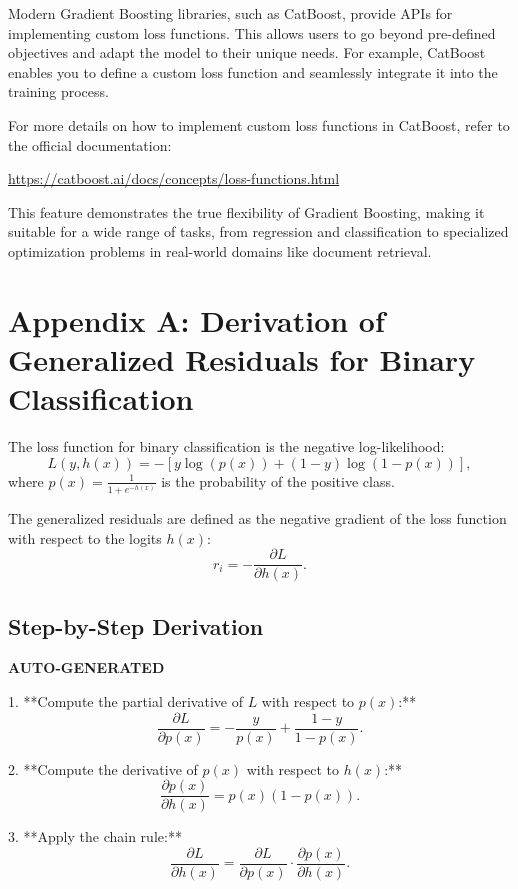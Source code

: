 \documentclass[12pt]{article}
\begin{document}
Modern Gradient Boosting libraries, such as CatBoost, provide APIs for implementing custom loss functions. This allows users to go beyond pre-defined objectives and adapt the model to their unique needs. For example, CatBoost enables you to define a custom loss function and seamlessly integrate it into the training process.

For more details on how to implement custom loss functions in CatBoost, refer to the official documentation:
\begin{center}
\url{https://catboost.ai/docs/concepts/loss-functions.html}
\end{center}

This feature demonstrates the true flexibility of Gradient Boosting, 
making it suitable for a wide range of tasks, 
from regression and classification to specialized optimization problems 
in real-world domains like document retrieval.


\newpage
\appendix
\section{Appendix A: Derivation of Generalized Residuals for Binary Classification}
\label{sec:appendixA}

The loss function for binary classification is the negative log-likelihood:
\[
L(y, h(x)) = -\left[ y \log(p(x)) + (1-y) \log(1-p(x)) \right],
\]
where \( p(x) = \frac{1}{1 + e^{-h(x)}} \) is the probability of the positive class.

The generalized residuals are defined as the negative gradient of the loss function with respect to the logits \( h(x) \):
\[
r_i = -\frac{\partial L}{\partial h(x)}.
\]

\subsection*{Step-by-Step Derivation}
\textbf{AUTO-GENERATED}

1. **Compute the partial derivative of \( L \) with respect to \( p(x) \):**
   \[
   \frac{\partial L}{\partial p(x)} = -\frac{y}{p(x)} + \frac{1-y}{1-p(x)}.
   \]

2. **Compute the derivative of \( p(x) \) with respect to \( h(x) \):**
   \[
   \frac{\partial p(x)}{\partial h(x)} = p(x)(1-p(x)).
   \]

3. **Apply the chain rule:**
   \[
   \frac{\partial L}{\partial h(x)} = \frac{\partial L}{\partial p(x)} \cdot \frac{\partial p(x)}{\partial h(x)}.
   \]
\end{document}
